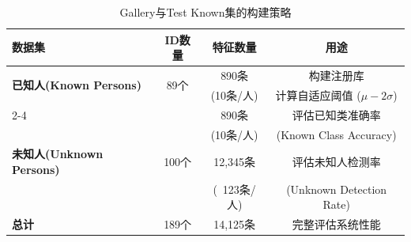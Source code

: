 
\begin{table}[htbp]
\centering
\caption{Gallery与Test Known集的构建策略}
\label{tab:gallery_test_split}
\begin{tabular}{|l|c|c|c|}
\hline
\textbf{数据集} & \textbf{ID数量} & \textbf{特征数量} & \textbf{用途} \\
\hline
\multirow{2}{*}{\textbf{已知人(Known Persons)}} & \multirow{2}{*}{89个} & 890条 & 构建注册库 \\
 & & (10条/人) & 计算自适应阈值 ($\mu - 2\sigma$) \\
\cline{2-4}
 & & 890条 & 评估已知类准确率 \\
 & & (10条/人) & (Known Class Accuracy) \\
\hline
\textbf{未知人(Unknown Persons)} & 100个 & 12,345条 & 评估未知人检测率 \\
 & & (~123条/人) & (Unknown Detection Rate) \\
\hline
\textbf{总计} & 189个 & 14,125条 & 完整评估系统性能 \\
\hline
\end{tabular}
\end{table}
